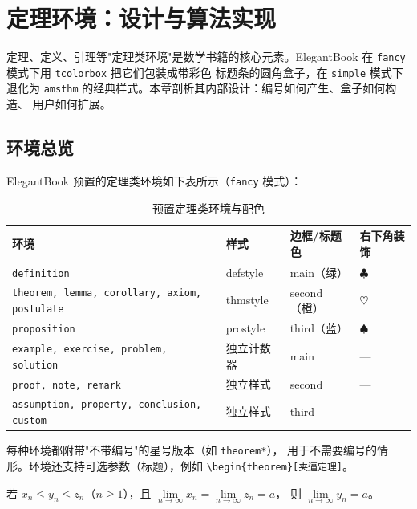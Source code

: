 
\chapter{定理环境：设计与算法实现}

定理、定义、引理等"定理类环境"是数学书籍的核心元素。ElegantBook
在 \texttt{fancy} 模式下用 \texttt{tcolorbox} 把它们包装成带彩色
标题条的圆角盒子，在 \texttt{simple} 模式下退化为 \texttt{amsthm}
的经典样式。本章剖析其内部设计：编号如何产生、盒子如何构造、
用户如何扩展。

\section{环境总览}

ElegantBook 预置的定理类环境如下表所示（\texttt{fancy} 模式）：

\begin{table}[htbp]
  \centering
  \caption{预置定理类环境与配色}\label{tab:envs}
  \begin{tabular}{llll}
    \toprule
    环境 & 样式 & 边框/标题色 & 右下角装饰 \\
    \midrule
    \texttt{definition} & defstyle & main（绿） & $\clubsuit$ \\
    \texttt{theorem, lemma, corollary, axiom, postulate} & thmstyle & second（橙） & $\heartsuit$ \\
    \texttt{proposition} & prostyle & third（蓝） & $\spadesuit$ \\
    \texttt{example, exercise, problem, solution} & 独立计数器 & main & --- \\
    \texttt{proof, note, remark} & 独立样式 & second & --- \\
    \texttt{assumption, property, conclusion, custom} & 独立样式 & third & --- \\
    \bottomrule
  \end{tabular}
\end{table}

每种环境都附带"不带编号"的星号版本（如 \texttt{theorem*}），
用于不需要编号的情形。环境还支持可选参数（标题），例如
\verb|\begin{theorem}[夹逼定理]|。

\begin{example}[定理环境的使用]
\begin{theorem}[夹逼定理]
若 $x_n\leqslant y_n\leqslant z_n$（$n\geqslant1$），且
$\lim\limits_{n\to\infty}x_n=\lim\limits_{n\to\infty}z_n=a$，
则 $\lim\limits_{n\to\infty}y_n=a$。
\end{theorem}
\end{example}

